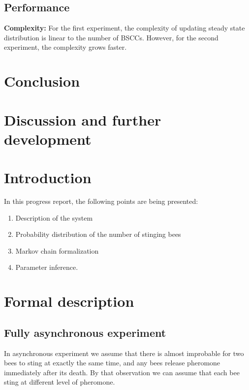 \documentclass[12pt]{article}
\begin{document}
\subsection{Performance}
\textbf{Complexity: } For the first experiment, the complexity of updating steady state distribution
is linear to the number of BSCCs. However, for the second experiment, the
complexity grows faster.\\



\section{Conclusion}










\section{Discussion and further development}



\section{Introduction}
In this progress report, the following points are being presented:
\begin{enumerate}
\item Description of the system
\item Probability distribution of the number of stinging bees
\item Markov chain formalization
\item Parameter inference.
\end{enumerate}

\section{Formal description}

\subsection{Fully asynchronous experiment}
In asynchronous experiment we assume that there is almost improbable for two
bees to sting at exactly the same time, and any bees release pheromone
immediately after its death. By that observation we can assume that each bee
sting at different level of pheromone.\\
\end{document}
